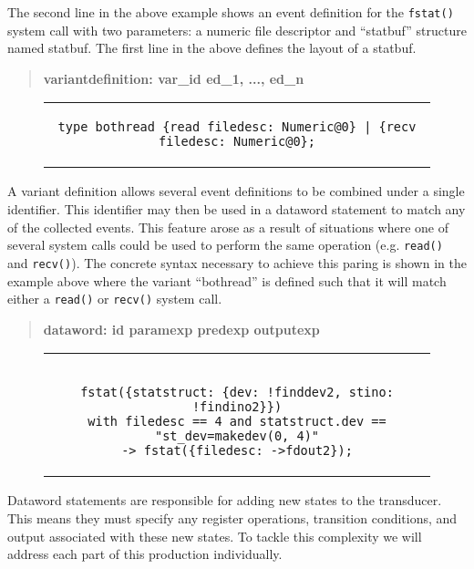 The second line in the above example shows an event
definition for the {\tt fstat()} system call with two parameters: a numeric
file descriptor and ``statbuf'' structure named statbuf.
The first line in the above defines the layout of a statbuf.


\begin{quote}
\centering
\textbf{variantdefinition: var\_id ed\_1, ..., ed\_n}
\end{quote}

\begin{figure}[H]
\centering
\begin{tabular}{c}
\begin{lstlisting}
type bothread {read filedesc: Numeric@0} | {recv filedesc: Numeric@0};
\end{lstlisting}
\end{tabular}
\end{figure}

A variant definition allows several event definitions to be combined under
a single identifier.  This identifier may then be used in a dataword
statement to match any of the collected events.  This feature arose as a
result of situations where one of several system calls could be used to
perform the same operation (e.g. {\tt read()} and {\tt recv()}).  The
concrete syntax necessary to achieve this paring is shown in the example
above where the variant ``bothread'' is defined such that it will match
either a {\tt read()} or {\tt recv()} system call.

\begin{quote}
\centering
\textbf{dataword: id paramexp predexp outputexp}
\end{quote}

\begin{figure}[H]
\centering
\begin{tabular}{c}
\begin{lstlisting}

fstat({statstruct: {dev: !finddev2, stino: !findino2}})
with filedesc == 4 and statstruct.dev == "st_dev=makedev(0, 4)"
-> fstat({filedesc: ->fdout2});

\end{lstlisting}
\end{tabular}
\end{figure}

Dataword statements are responsible for adding new states to the
transducer.  This means they must specify any register operations,
transition conditions, and output associated with these new states.  To
tackle this complexity we will address each part of this production
individually.

